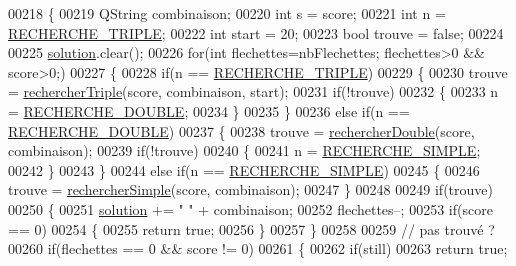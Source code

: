 \begin{DoxyCode}
00218 \{
00219     QString combinaison;
00220     \textcolor{keywordtype}{int} s = score;
00221     \textcolor{keywordtype}{int} n = \hyperlink{solution_8h_a911c709f6e0d892d5aa2c1da0d3f2d02}{RECHERCHE\_TRIPLE};
00222     \textcolor{keywordtype}{int} start = 20;
00223     \textcolor{keywordtype}{bool} trouve = \textcolor{keyword}{false};
00224 
00225     \hyperlink{class_solution_a03b47dedfe8a8f8244f7e633cbaa30fb}{solution}.clear();
00226     \textcolor{keywordflow}{for}(\textcolor{keywordtype}{int} flechettes=nbFlechettes; flechettes>0 && score>0;)
00227     \{
00228         \textcolor{keywordflow}{if}(n == \hyperlink{solution_8h_a911c709f6e0d892d5aa2c1da0d3f2d02}{RECHERCHE\_TRIPLE})
00229         \{
00230             trouve = \hyperlink{class_solution_a7f3302e8292858a51795f08751d54ef9}{rechercherTriple}(score, combinaison, start);
00231             \textcolor{keywordflow}{if}(!trouve)
00232             \{
00233                 n = \hyperlink{solution_8h_af2093607a1488c24e74beed2dc996bf4}{RECHERCHE\_DOUBLE};
00234             \}
00235         \}
00236         \textcolor{keywordflow}{else} \textcolor{keywordflow}{if}(n == \hyperlink{solution_8h_af2093607a1488c24e74beed2dc996bf4}{RECHERCHE\_DOUBLE})
00237         \{
00238             trouve = \hyperlink{class_solution_aa54574bee5bde60d55a9da346a61cf48}{rechercherDouble}(score, combinaison);
00239             \textcolor{keywordflow}{if}(!trouve)
00240             \{
00241                 n = \hyperlink{solution_8h_a472930bff329899e6d9f3096fb778325}{RECHERCHE\_SIMPLE};
00242             \}
00243         \}
00244         \textcolor{keywordflow}{else} \textcolor{keywordflow}{if}(n == \hyperlink{solution_8h_a472930bff329899e6d9f3096fb778325}{RECHERCHE\_SIMPLE})
00245         \{
00246             trouve = \hyperlink{class_solution_ab8223455a5a35aceb7de18970f94db48}{rechercherSimple}(score, combinaison);
00247         \}
00248 
00249         \textcolor{keywordflow}{if}(trouve)
00250         \{
00251             \hyperlink{class_solution_a03b47dedfe8a8f8244f7e633cbaa30fb}{solution} +=  \textcolor{stringliteral}{" "} + combinaison;
00252             flechettes--;
00253             \textcolor{keywordflow}{if}(score == 0)
00254             \{
00255                 \textcolor{keywordflow}{return} \textcolor{keyword}{true};
00256             \}
00257         \}
00258 
00259         \textcolor{comment}{// pas trouvé ?}
00260         \textcolor{keywordflow}{if}(flechettes == 0 && score != 0)
00261         \{
00262             \textcolor{keywordflow}{if}(still)
00263                 \textcolor{keywordflow}{return} \textcolor{keyword}{true};

\end{DoxyCode}
